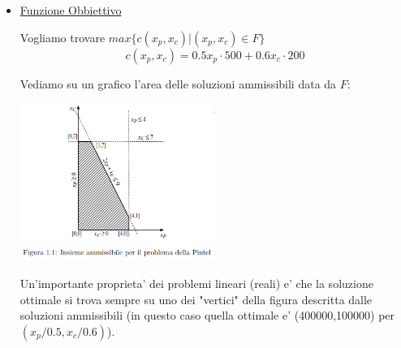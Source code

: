 {\begin{itemize}
      Dobbiamo considerare anche il massimo numero di wafer, ipotizzo che un wafer puo' essere usato tutto solo per pintium o solo per coloron:
      \begin{align*}
        w_p + w_c \leq 3000
      \end{align*}

      Queste nuove variabili devono essere legate in qualche modo a quelle principali che usiamo nella FO:
      \begin{align*}
        300 w_p = x_p\\
        500 w_c = x_c
      \end{align*}

      Possiamo quindi tornare sul vincolo sul numero di wafer e sostituire $ w_p, w_c $ con $ x_p, x_c $ per riscrivere il vincolo relativo alle ultime due variabili, riducendo quindi le variabili utilizzate e semplificando il problema:

      \begin{align*}
      5 x_p + 3 x_c \leq 4500000
      \end{align*}

      L'insieme delle soluzioni ammissibili e' quindi:
      \[
        F = \{(x_p, x_c) | 0 \leq x_p 0.5 \leq 400000, 0 \leq x_c 0.6 \leq 700000, 5 x_p + 3 x_c \leq 4500000\}
      \]
    \item \underline{Funzione Obbiettivo}

      Vogliamo trovare $ max \{c(x_p, x_c) | (x_p, x_c) \in F \} $
      \[
        c(x_p, x_c) = 0.5 x_p \cdot 500 + 0.6 x_c \cdot 200
      \]

      Vediamo su un grafico l'area delle soluzioni ammissibili data da $ F $:
      \begin{center}
        \includegraphics[width=0.5\textwidth]{img/2025-03-03-12-33-31.png}
      \end{center}

      Un'importante proprieta' dei problemi lineari (reali) e' che la soluzione ottimale si trova sempre su uno dei "vertici" della figura descritta dalle soluzioni ammissibili (in questo caso quella ottimale e' (400000,100000) per $ (x_p/0.5, x_c/0.6) $).


\end{itemize}}
